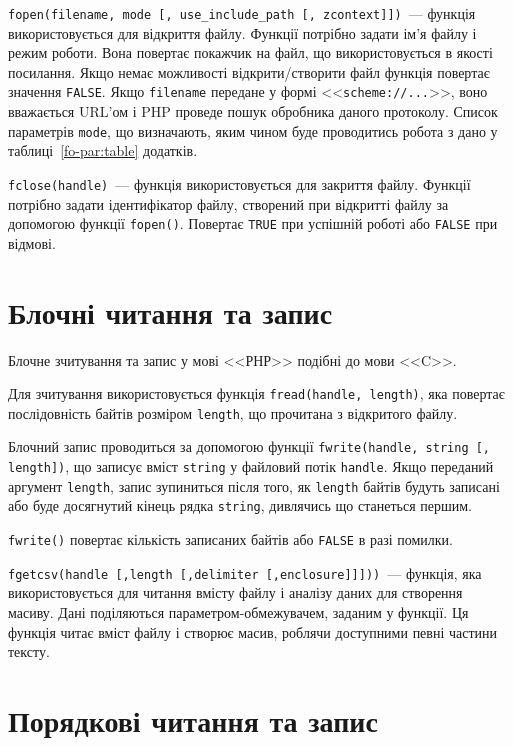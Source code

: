 \verb|fopen(filename, mode [, use_include_path [, zcontext]])|~--- функція використовується для відкриття файлу. Функції потрібно задати ім'я файлу і режим роботи. Вона повертає покажчик на файл, що використовується в якості посилання. Якщо немає можливості відкрити/створити файл функція повертає значення \verb'FALSE'. Якщо \verb'filename' передане у формі <<\verb|scheme://...|>>, воно вважається URL'ом і PHP проведе пошук обробника даного протоколу. Список параметрів \verb'mode', що визначають, яким чином буде проводитись робота з дано у таблиці~\ref{fo-par:table} додатків.

\verb|fclose(handle)|~--- функція використовується для закриття файлу. Функції потрібно задати ідентифікатор файлу, створений при відкритті файлу за допомогою функції \verb|fopen()|. Повертає \verb'TRUE' при успішній роботі або \verb'FALSE' при відмові.

\section{Блочні читання та запис}
Блочне зчитування та запис у мові <<РНР>> подібні до мови <<C>>. 

Для зчитування використовується функція \verb'fread(handle, length)', яка повертає послідовність байтів розміром \verb'length', що прочитана з відкритого файлу.

Блочний запис проводиться за допомогою функції \verb'fwrite(handle, string [, length])', що записує вміст \verb'string' у файловий потік \verb'handle'. Якщо переданий аргумент \verb'length', запис зупиниться після того, як \verb'length' байтів будуть записані або буде досягнутий кінець рядка \verb'string', дивлячись що станеться першим.

\verb'fwrite()' повертає кількість записаних байтів або \verb'FALSE' в разі помилки. 




\verb'fgetcsv(handle [,length [,delimiter [,enclosure]]]))'~--- функція, яка використовується для читання вмісту файлу і аналізу даних для створення масиву. Дані поділяються параметром-обмежувачем, заданим у функції. Ця функція читає вміст файлу і створює масив, роблячи доступними певні частини тексту.



\section{Порядкові читання та запис}

